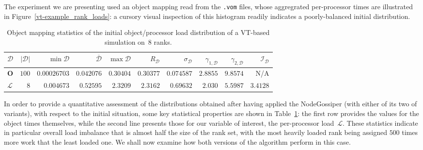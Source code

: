 The experiment we are presenting used an object mapping read from the
\texttt{.vom} files, whose aggregrated per-processor times are
illustrated in Figure~\ref{vt-example_rank_loads}: a cursory visual inspection
of this histogram readily indicates a poorly-balanced initial distribution.

\begin{table}[htb!]
\begin{center}
\begin{tabular}{@{}lrrrrrrrrr@{}}
\hline
$\mathcal{D}$ &
$\vert\mathcal{D}\vert$ &
$\min{\mathcal{D}}$ &
$\overline{\mathcal{D}}$ &
$\max{\mathcal{D}}$ &
$R_{\mathcal{D}}$ &
$\sigma_{\mathcal{D}}$ &
$\gamma_{1,\mathcal{D}}$ &
$\gamma_{2,\mathcal{D}}$ &
$\mathcal{I}_{\mathcal{D}}$ \\
\hline\hline
$\mathbf{O}$ &
$100$     & $0.00026703$ & $0.042076$ & $0.30404$ &
$0.30377$ & $0.074587$   &$2.8855$    & $9.8574$ &
N/A \\\hline
$\mathcal{L}$ &
$8$      & $0.004673$ & $0.52595$ & $2.3209$ &
$2.3162$ & $0.69632$  & $2.030$   & $5.5987$ &
$3.4128$\\\hline
\end{tabular}
\end{center}
\caption{\label{t:vt-example} Object mapping statistics of the initial
object/processor load distribution of a \textsf{VT}-based simulation
on~8 ranks.}
\end{table}

In order to provide a quantitative assessment of the distributions
obtained after having applied the \textsf{NodeGossiper} (with either
of its two of variants), with respect to the initial situation, some
key statistical properties are shown in Table~\ref{t:vt-example}: the
first row provides the values for the object times themselves, while
the second line presents those for our variable of interest, the
per-processor load~$\mathcal{L}$.
These statistics indicate in particular overall load imbalance
that is almost half the size of the rank set, with the most heavily
loaded rank being assigned $500$ times more work that the least loaded
one.
We shall now examine how both versions of the algorithm perform in
this case.


